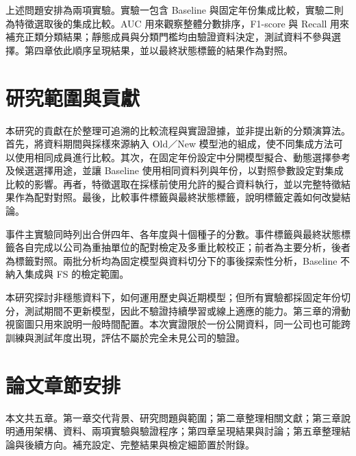 上述問題安排為兩項實驗。實驗一包含 Baseline 與固定年份集成比較，實驗二則為特徵選取後的集成比較。AUC 用來觀察整體分數排序，F1-score 與 Recall 用來補充正類分類結果；靜態成員與分類門檻均由驗證資料決定，測試資料不參與選擇。第四章依此順序呈現結果，並以最終狀態標籤的結果作為對照。

\section{研究範圍與貢獻}

本研究的貢獻在於整理可追溯的比較流程與實證證據，並非提出新的分類演算法。首先，將資料期間與採樣來源納入 Old／New 模型池的組成，使不同集成方法可以使用相同成員進行比較。其次，在固定年份設定中分開模型擬合、動態選擇參考及候選選擇用途，並讓 Baseline 使用相同資料列與年份，以對照參數設定對集成比較的影響。再者，特徵選取在採樣前使用允許的擬合資料執行，並以完整特徵結果作為配對對照。最後，比較事件標籤與最終狀態標籤，說明標籤定義如何改變結論。

事件主實驗同時列出合併四年、各年度與十個種子的分數。事件標籤與最終狀態標籤各自完成以公司為重抽單位的配對檢定及多重比較校正；前者為主要分析，後者為標籤對照。兩批分析均為固定模型與資料切分下的事後探索性分析，Baseline 不納入集成與 FS 的檢定範圍。

本研究探討非穩態資料下，如何運用歷史與近期模型；但所有實驗都採固定年份切分，測試期間不更新模型，因此不驗證持續學習或線上適應的能力。第三章的滑動視窗圖只用來說明一般時間配置。本次實證限於一份公開資料，同一公司也可能跨訓練與測試年度出現，評估不屬於完全未見公司的驗證。

\section{論文章節安排}

本文共五章。第一章交代背景、研究問題與範圍；第二章整理相關文獻；第三章說明通用架構、資料、兩項實驗與驗證程序；第四章呈現結果與討論；第五章整理結論與後續方向。補充設定、完整結果與檢定細節置於附錄。
\endgroup
